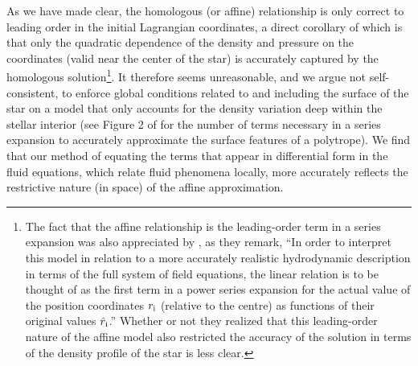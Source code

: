 \documentclass[twocolumn]{aastex62}
\begin{document}
As we have made clear, the homologous (or affine) relationship is only correct to leading order in the initial Lagrangian coordinates, a direct corollary of which is that only the quadratic dependence of the density and pressure on the coordinates (valid near the center of the star) is accurately captured by the homologous solution\footnote{{The fact that the affine relationship is the leading-order term in a series expansion was also appreciated by \citet{carter83}, as they remark, ``In order to interpret this model in relation to a more accurately realistic hydrodynamic description in terms of the full system of field equations, the linear relation is to be thought of as the first term in a power series expansion for the actual value of the position coordinates $r_{\rm i}$ (relative to the centre) as functions of their original values $\hat{r}_{\rm i}$.'' Whether or not they realized that this leading-order nature of the affine model also restricted the accuracy of the solution in terms of the density profile of the star is less clear.}}. It therefore seems unreasonable, and we argue not self-consistent, to enforce global conditions related to and including the surface of the star on a model that only accounts for the density variation deep within the stellar interior (see Figure 2 of \citealt{coughlin21b} for the number of terms necessary in a series expansion to accurately approximate the surface features of a polytrope). We find that our method of equating the terms that appear in differential form in the fluid equations, which relate fluid phenomena locally, more accurately reflects the restrictive nature (in space) of the affine approximation.
\end{document}
